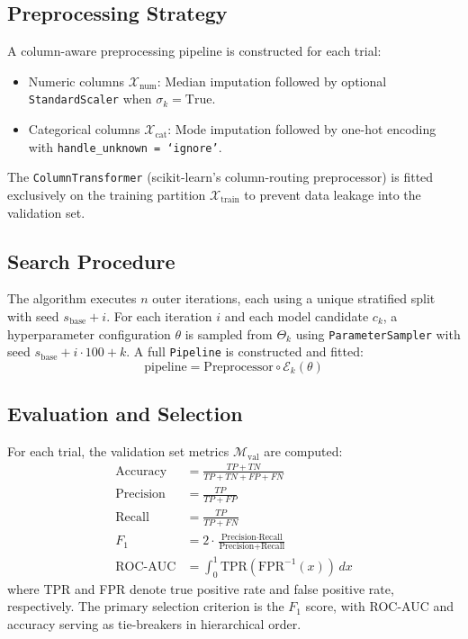 \documentclass[diagnostics,article,accept,pdftex,moreauthors]{Definitions/mdpi}
\begin{document}
\subsection[\appendixname~\thesubsection]{Preprocessing Strategy}
A column-aware preprocessing pipeline is constructed for each trial:
\begin{itemize}
    \item Numeric columns $\mathcal{X}_{\text{num}}$: Median imputation followed by optional \texttt{StandardScaler} when $\sigma_k = \text{True}$.
    \item Categorical columns $\mathcal{X}_{\text{cat}}$: Mode imputation followed by one-hot encoding with \texttt{handle\_unknown = ‘ignore'}.
\end{itemize}

{The} %
 \texttt{ColumnTransformer} {(scikit-learn's column-routing preprocessor)} %
is fitted exclusively on the training
partition $\mathcal{X}_{\text{train}}$ to prevent data leakage into
the validation set.

\subsection[\appendixname~\thesubsection]{Search Procedure}
The algorithm executes $n$ outer iterations, each using a unique
stratified split with seed $s_{\text{base}} + i$. For each iteration
$i$ and each model candidate $c_k$, a hyperparameter configuration
$\theta$ is sampled from $\Theta_k$ using \texttt{ParameterSampler}
with seed $s_{\text{base}} + i \cdot 100 + k$. A full
\texttt{Pipeline} is constructed and fitted:
\[
\text{pipeline} = \text{Preprocessor} \circ \mathcal{E}_k(\theta)
\]


\subsection[\appendixname~\thesubsection]{Evaluation and Selection}
For each trial, the validation set metrics $\mathcal{M}_{\text{val}}$ are computed:
\begin{align}
\text{Accuracy} &= \frac{TP + TN}{TP + TN + FP + FN} \\
\text{Precision} &= \frac{TP}{TP + FP} \\
\text{Recall} &= \frac{TP}{TP + FN} \\
F_1 &= 2 \cdot \frac{\text{Precision} \cdot \text{Recall}}{\text{Precision} + \text{Recall}} \\
\text{ROC-AUC} &= \int_{0}^{1} \text{TPR}(\text{FPR}^{-1}(x)) \, dx
\end{align}
where TPR and FPR denote true positive rate and false positive rate, respectively. The primary selection criterion is the $F_1$ score, with ROC-AUC and accuracy serving as tie-breakers in hierarchical order.
\end{document}
